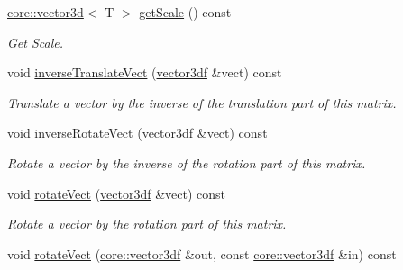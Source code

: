 \begin{DoxyCompactItemize}
\hyperlink{classirr_1_1core_1_1vector3d}{core\+::vector3d}$<$ T $>$ \hyperlink{classirr_1_1core_1_1CMatrix4_a27801e0cb2d3ce458f66ff7cfbe13544}{get\+Scale} () const
\begin{DoxyCompactList}\small\item\em Get Scale. \end{DoxyCompactList}\item 
\mbox{\label{classirr_1_1core_1_1CMatrix4_a7850ba9e85bff2b7d8e3bce517e0aba0}} 
void \hyperlink{classirr_1_1core_1_1CMatrix4_a7850ba9e85bff2b7d8e3bce517e0aba0}{inverse\+Translate\+Vect} (\hyperlink{namespaceirr_1_1core_a06f169d08b5c429f5575acb7edbad811}{vector3df} \&vect) const
\begin{DoxyCompactList}\small\item\em Translate a vector by the inverse of the translation part of this matrix. \end{DoxyCompactList}\item 
\mbox{\label{classirr_1_1core_1_1CMatrix4_aed5bc8bb8e9b58549034e2f48189d35e}} 
void \hyperlink{classirr_1_1core_1_1CMatrix4_aed5bc8bb8e9b58549034e2f48189d35e}{inverse\+Rotate\+Vect} (\hyperlink{namespaceirr_1_1core_a06f169d08b5c429f5575acb7edbad811}{vector3df} \&vect) const
\begin{DoxyCompactList}\small\item\em Rotate a vector by the inverse of the rotation part of this matrix. \end{DoxyCompactList}\item 
\mbox{\label{classirr_1_1core_1_1CMatrix4_a45e023efd5e6d0e328c63705bfb5bd06}} 
void \hyperlink{classirr_1_1core_1_1CMatrix4_a45e023efd5e6d0e328c63705bfb5bd06}{rotate\+Vect} (\hyperlink{namespaceirr_1_1core_a06f169d08b5c429f5575acb7edbad811}{vector3df} \&vect) const
\begin{DoxyCompactList}\small\item\em Rotate a vector by the rotation part of this matrix. \end{DoxyCompactList}\item 
\mbox{\label{classirr_1_1core_1_1CMatrix4_aa421db751017ae447e20ac946bb4ad92}} 
void \hyperlink{classirr_1_1core_1_1CMatrix4_aa421db751017ae447e20ac946bb4ad92}{rotate\+Vect} (\hyperlink{namespaceirr_1_1core_a06f169d08b5c429f5575acb7edbad811}{core\+::vector3df} \&out, const \hyperlink{namespaceirr_1_1core_a06f169d08b5c429f5575acb7edbad811}{core\+::vector3df} \&in) const

\end{DoxyCompactItemize}
